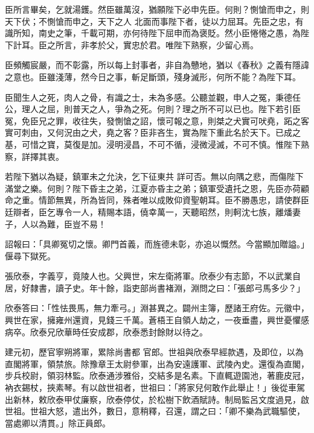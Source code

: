 \begin{pinyinscope}
 臣所言畢矣，乞就湯鑊。然臣雖萬沒，猶願陛下必申先臣。何則？惻愴而申之，則天下伏；不惻愴而申之，天下之人
 北面而事陛下者，徒以力屈耳。先臣之忠，有識所知，南史之筆，千載可期，亦何待陛下屈申而為褒貶。然小臣惓惓之愚，為陛下計耳。臣之所言，非孝於父，實忠於君。唯陛下熟察，少留心焉。



 臣頻觸宸嚴，而不彰露，所以每上封事者，非自為戇地，猶以《春秋》之義有隱諱之意也。臣雖淺薄，然今日之事，斬足斷頭，殘身滅形，何所不能？為陛下耳。



 臣聞生人之死，肉人之骨，有識之士，未為多感。公聽並觀，申人之冤，秉德任公，理人之屈，則普天之人，爭為之死。何則？理之所不可以已也。陛下若引臣冤，免臣兄之罪，收往失，發惻愴之詔，懷可報之意，則桀之犬實可吠堯，跖之客實可刺由，又何況由之犬，堯之客？臣非吝生，實為陛下重此名於天下。已成之基，可惜之寶，莫復是加。浸明浸昌，不可不循，浸微浸滅，不可不慎。惟陛下熟察，詳擇其衷。



 若陛下猶以為疑，鎮軍未之允決，乞下征東共
 詳可否。無以向隅之悲，而傷陛下滿堂之樂。何則？陛下昏主之弟，江夏亦昏主之弟；鎮軍受遺托之恩，先臣亦荷顧命之重。情節無異，所為皆同，殊者唯以成敗仰資聖朝耳。臣不勝愚忠，請使群臣廷辯者，臣乞專令一人，精賜本語，僥幸萬一，天聽昭然，則軻沈七族，離燔妻子，人以為難，臣豈不易！



 詔報曰：「具卿冤切之懷。卿門首義，而旌德未彰，亦追以慨然。今當顯加贈謚。」偃尋下獄死。



 張欣泰，字義亨，竟陵人也。父興世，宋左衛將軍。欣泰少有志節，不以武業自居，好隸書，讀子史。年十餘，詣吏部尚書褚淵，淵問之曰：「張郎弓馬多少？」



 欣泰答曰：「性怯畏馬，無力牽弓。」淵甚異之。闢州主簿，歷諸王府佐。元徽中，興世在家，擁雍州還資，見錢三千萬。蒼梧王自領人劫之，一夜垂盡，興世憂懼感病卒。欣泰兄欣華時任安成郡，欣泰悉封餘財以待之。



 建元初，歷官寧朔將軍，累除尚書都
 官郎。世祖與欣泰早經款遇，及即位，以為直閣將軍，領禁旅。除豫章王太尉參軍，出為安遠護軍、武陵內史。還復為直閣，步兵校尉，領羽林監。欣泰通涉雅俗，交結多是名素。下直輒遊園池，著鹿皮冠，衲衣錫杖，挾素琴。有以啟世祖者，世祖曰：「將家兒何敢作此舉止！」後從車駕出新林，敕欣泰甲仗廉察，欣泰停仗，於松樹下飲酒賦詩。制局監呂文度過見，啟世祖。世祖大怒，遣出外，數日，意稍釋，召還，謂之曰：「卿不樂為武職驅使，當處卿以清貫。」除正員郎。




\end{pinyinscope}
